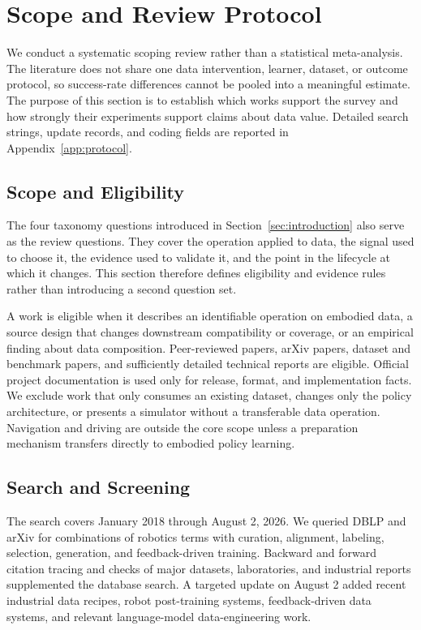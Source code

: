 \section{Scope and Review Protocol}
\label{sec:method}

We conduct a systematic scoping review rather than a statistical meta-analysis.
The literature does not share one data intervention, learner, dataset, or outcome protocol, so success-rate differences cannot be pooled into a meaningful estimate.
The purpose of this section is to establish which works support the survey and how strongly their experiments support claims about data value.
Detailed search strings, update records, and coding fields are reported in Appendix~\ref{app:protocol}.

\subsection{Scope and Eligibility}

The four taxonomy questions introduced in Section~\ref{sec:introduction} also serve as the review questions.
They cover the operation applied to data, the signal used to choose it, the evidence used to validate it, and the point in the lifecycle at which it changes.
This section therefore defines eligibility and evidence rules rather than introducing a second question set.

A work is eligible when it describes an identifiable operation on embodied data, a source design that changes downstream compatibility or coverage, or an empirical finding about data composition.
Peer-reviewed papers, arXiv papers, dataset and benchmark papers, and sufficiently detailed technical reports are eligible.
Official project documentation is used only for release, format, and implementation facts.
We exclude work that only consumes an existing dataset, changes only the policy architecture, or presents a simulator without a transferable data operation.
Navigation and driving are outside the core scope unless a preparation mechanism transfers directly to embodied policy learning.

\subsection{Search and Screening}

The search covers January 2018 through August 2, 2026.
We queried DBLP and arXiv for combinations of robotics terms with curation, alignment, labeling, selection, generation, and feedback-driven training.
Backward and forward citation tracing and checks of major datasets, laboratories, and industrial reports supplemented the database search.
A targeted update on August 2 added recent industrial data recipes, robot post-training systems, feedback-driven data systems, and relevant language-model data-engineering work.

